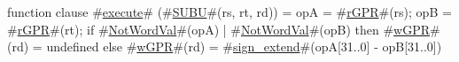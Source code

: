 function clause #\hyperref[zexecute]{execute}# (#\hyperref[zSUBU]{SUBU}#(rs, rt, rd)) =
  {
    opA = #\hyperref[zrGPR]{rGPR}#(rs);
    opB = #\hyperref[zrGPR]{rGPR}#(rt);
    if #\hyperref[zNotWordVal]{NotWordVal}#(opA) | #\hyperref[zNotWordVal]{NotWordVal}#(opB) then
      #\hyperref[zwGPR]{wGPR}#(rd) = undefined
    else
      #\hyperref[zwGPR]{wGPR}#(rd) = #\hyperref[zsignzyextend]{sign\_extend}#(opA[31..0] - opB[31..0])
  }
